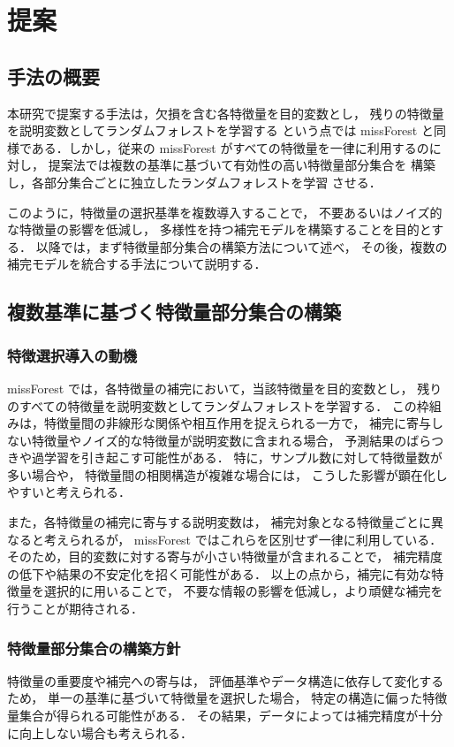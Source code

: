 \section{提案}
\subsection{手法の概要}
本研究で提案する手法は，欠損を含む各特徴量を目的変数とし，
残りの特徴量を説明変数としてランダムフォレストを学習する
という点では missForest と同様である．しかし，従来の
missForest がすべての特徴量を一律に利用するのに対し，
提案法では複数の基準に基づいて有効性の高い特徴量部分集合を
構築し，各部分集合ごとに独立したランダムフォレストを学習
させる．

このように，特徴量の選択基準を複数導入することで，
不要あるいはノイズ的な特徴量の影響を低減し，
多様性を持つ補完モデルを構築することを目的とする．
以降では，まず特徴量部分集合の構築方法について述べ，
その後，複数の補完モデルを統合する手法について説明する．

\subsection{複数基準に基づく特徴量部分集合の構築}
\subsubsection{特徴選択導入の動機}
missForest では，各特徴量の補完において，当該特徴量を目的変数とし，
残りのすべての特徴量を説明変数としてランダムフォレストを学習する．
この枠組みは，特徴量間の非線形な関係や相互作用を捉えられる一方で，
補完に寄与しない特徴量やノイズ的な特徴量が説明変数に含まれる場合，
予測結果のばらつきや過学習を引き起こす可能性がある．
特に，サンプル数に対して特徴量数が多い場合や，
特徴量間の相関構造が複雑な場合には，
こうした影響が顕在化しやすいと考えられる．

また，各特徴量の補完に寄与する説明変数は，
補完対象となる特徴量ごとに異なると考えられるが，
missForest ではこれらを区別せず一律に利用している．
そのため，目的変数に対する寄与が小さい特徴量が含まれることで，
補完精度の低下や結果の不安定化を招く可能性がある．
以上の点から，補完に有効な特徴量を選択的に用いることで，
不要な情報の影響を低減し，より頑健な補完を行うことが期待される．

\subsubsection{特徴量部分集合の構築方針}
特徴量の重要度や補完への寄与は，
評価基準やデータ構造に依存して変化するため，
単一の基準に基づいて特徴量を選択した場合，
特定の構造に偏った特徴量集合が得られる可能性がある．
その結果，データによっては補完精度が十分に向上しない場合も考えられる．

